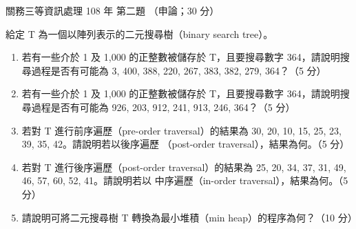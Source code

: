 \begin{pastexam}[label={px:gw3-108-ds-02}]{關務三等資訊處理 108 年 第二題}
（申論；30 分）

給定 T 為一個以陣列表示的二元搜尋樹（binary search tree）。
\begin{enumerate}[leftmargin=2.2em]
\item[㈠] 若有一些介於 1 及 1,000 的正整數被儲存於 T，且要搜尋數字 364，請說明搜尋過程是否有可能為 3, 400, 388,
220, 267, 383, 382, 279, 364？（5 分）
\item[㈡] 若有一些介於 1 及 1,000 的正整數被儲存於 T，且要搜尋數字 364，請說明搜尋過程是否有可能為 926, 203,
912, 241, 913, 246, 364？（5 分）
\item[㈢] 若對 T 進行前序遍歷（pre-order traversal）的結果為 30, 20, 10, 15, 25, 23, 39, 35, 42。請說明若以後序遍歷
（post-order traversal），結果為何。（5 分）
\item[㈣] 若對 T 進行後序遍歷（post-order traversal）的結果為 25, 20, 34, 37, 31, 49, 46, 57, 60, 52, 41。請說明若以
中序遍歷（in-order traversal），結果為何。（5 分）
\item[㈤] 請說明可將二元搜尋樹 T 轉換為最小堆積（min heap）的程序為何？（10 分）
\end{enumerate}
\end{pastexam}

